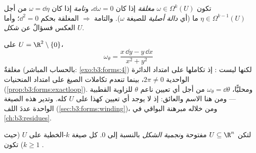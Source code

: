 \begin{definition}\label{def:b3:forms:closedexact}
تكون $\omega \in \Omega^k(U)$ \emph{مغلقة} إذا كان
$\dd\omega = 0$، و\emph{تامة} إذا كان $\omega = \dd\eta$
من أجل $\eta \in \Omega^{k-1}(U)$ ما (أي \emph{دالة أصلية} للصيغة $\omega$).
والتامة $\Rightarrow$ المغلقة بحكم $\dd^2 = 0$؛ وأما العكس
فسؤالٌ عن \emph{شكل} $U$.
\end{definition}

\begin{example}\label{ex:b3:forms:angular}
على $U = \R^2 \setminus \{0\}$،
\[
\omega_\theta = \frac{x\,\dd y - y\,\dd x}{x^2 + y^2}
\]
مغلقةٌ (بالحساب المباشر: \cref{exo:b3:forms:4}) لكنها ليست : إذ
تكاملها على امتداد الدائرة الواحدية $2\pi \neq 0$، بينما تنعدم
تكاملات الصيغ  على امتداد المنحنيات 
(\cref{prop:b3:forms:exactloop}). ومحليًّا، $\omega_\theta = \dd\theta$ من أجل أي تعيين ناعم $\theta$
للزاوية القطبية --- ومن هنا الاسم والعائق: إذ لا يوجد أي تعيين
كهذا على $U$ كله. وتدير هذه الصيغة الواحدة عددَ اللف
(\cref{sec:b3:forms:winding})، ومن خلاله مبرهنة البواقي في \cref{ch:b3:residues}.
\end{example}

\begin{theorem}\label{thm:b3:forms:poincare}
لتكن $U \subseteq \R^n$ مفتوحة و\emph{نجمية الشكل} بالنسبة إلى $0$. كل
صيغة $k$-الخطية  على $U$ (حيث $k \geq 1$) تكون
.
\end{theorem}

